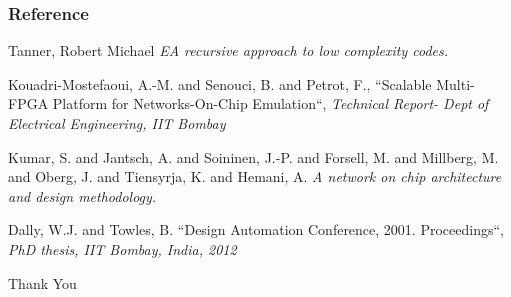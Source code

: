 \begin{frame}
\frametitle{Reference}
\begin{thebibliography}{10} 
\small
{} Tanner, Robert Michael
\emph  {EA recursive approach to low complexity codes. }

 Kouadri-Mostefaoui, A.-M. and Senouci, B. and Petrot, F., 
``Scalable Multi-FPGA Platform for Networks-On-Chip Emulation``,
\emph{Technical Report- Dept of Electrical Engineering, IIT Bombay}

 Kumar, S. and Jantsch, A. and Soininen, J.-P. and Forsell, M. and Millberg, M. and Oberg, J. and Tiensyrja, K. and Hemani, A.
\emph  {A network on chip architecture and design methodology. }

 Dally, W.J. and Towles, B.
``Design Automation Conference, 2001. Proceedings``,
\emph{PhD thesis, IIT Bombay, India, 2012}

\end{thebibliography}
\end{frame}


\begin{frame}
\begin{center}
Thank You 
\end{center}

\end{frame}

